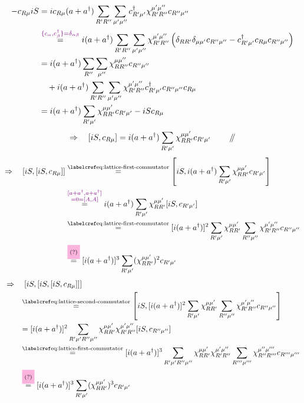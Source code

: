 
\begin{align*}
-c_{R\mu}iS
 &=ic_{R\mu}(a+a^\dagger)\sum_{R'R''}\sum_{\mu'\mu''}
      c^\dagger_{R'\mu'}\chi_{R'R''}^{\mu'\mu''}c_{R''\mu''}\\
 &\overset{\textcolor{violet}{\{c_\alpha,c_\beta^\dagger\}=\delta_{\alpha\beta}}}{=}
    i(a+a^\dagger)\sum_{R'R''}\sum_{\mu'\mu''}\chi_{R'R''}^{\mu'\mu''}
       \left(\delta_{RR'}\delta_{\mu\mu'}c_{R''\mu''}
           -c^\dagger_{R'\mu'}c_{R\mu}c_{R''\mu''}\right)\\
 &=i(a+a^\dagger)\sum_{R''}\sum_{\mu''}\chi_{RR''}^{\mu\mu''}c_{R''\mu''}\\
 &\quad+i(a+a^\dagger)\sum_{R'R''}\sum_{\mu'\mu''}
     \chi_{R'R''}^{\mu'\mu''}c^\dagger_{R'\mu'}c_{R''\mu''}c_{R\mu}\\
 &=i(a+a^\dagger)\sum_{R'\mu'}\chi_{RR'}^{\mu\mu'}c_{R'\mu'}-iS c_{R\mu}
\end{align*}
\begin{equation}
\Rightarrow\quad[iS,c_{R\mu}]
  =i(a+a^\dagger)\sum_{R'\mu'}\chi_{RR'}^{\mu\mu'}c_{R'\mu'}
  \qquad\mathrel{/\mkern-5mu/}
\label{eq:lattice-first-commutator}
\end{equation}
\begin{align}
\Rightarrow\quad[iS,[iS,c_{R\mu}]]
 &\stepref{eq:lattice-first-commutator}
   \left[iS,i(a+a^\dagger)\sum_{R'\mu'}\chi_{RR'}^{\mu\mu'}c_{R'\mu'}\right]
   \notag\\
 &\overset{\annotation{\substack{[a+a^\dagger,a+a^\dagger]\\=0=[A,A]}}}{=}
      i(a+a^\dagger)\sum_{R'\mu'}\chi_{RR'}^{\mu\mu'}[iS,c_{R'\mu'}]
   \notag\\
 &\stepref{eq:lattice-first-commutator}
      [i(a+a^\dagger)]^2\sum_{R'\mu'}\chi_{RR'}^{\mu\mu'}
          \sum_{R''\mu''}\chi_{R'R''}^{\mu'\mu''}c_{R''\mu''}
   \label{eq:lattice-second-commutator}\\
 &\overset{\text{\highlight{magenta}{(?)}}}{=}
      [i(a+a^\dagger)]^3\sum_{R'\mu'}(\chi_{RR'}^{\mu\mu'})^2c_{R'\mu'}
   \notag
\end{align}
\begin{align*}
&\Rightarrow\quad[iS,[iS,[iS,c_{R\mu}]]]\\
&\qquad\stepref{eq:lattice-second-commutator}
    \left[iS,[i(a+a^\dagger)]^2
       \sum_{R'\mu'}\chi_{RR'}^{\mu\mu'}
       \sum_{R''\mu''}\chi_{R'R''}^{\mu'\mu''}c_{R''\mu''}\right]\\
&\qquad=[i(a+a^\dagger)]^2\sum_{R'\mu'R''\mu''}
       \chi_{RR'}^{\mu\mu'}\chi_{R'R''}^{\mu'\mu''}[iS,c_{R''\mu''}]\\
&\qquad\stepref{eq:lattice-first-commutator}
     [i(a+a^\dagger)]^3\sum_{R'\mu'R''\mu''}
       \chi_{RR'}^{\mu\mu'}\chi_{R'R''}^{\mu'\mu''}
       \sum_{R'''\mu'''}\chi_{R''R'''}^{\mu''\mu'''}c_{R'''\mu'''}\\
&\qquad\overset{\text{\highlight{magenta}{(?)}}}{=}
     [i(a+a^\dagger)]^3\sum_{R'\mu'}(\chi_{RR'}^{\mu\mu'})^3c_{R'\mu'}
\end{align*}
